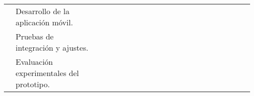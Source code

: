 \begin{landscape}
\begin{ThreePartTable}
\begin{longtable}{|p{}|p{5.5cm}|p{5.5cm}|l|l|l|l|l|l|l|l|l|l|l|l|l|l|l|l|l|l|l|}
      \cline{2-2}\cline{4-21}
                                                                                                                                                                                               & Desarrollo de la aplicación móvil.                                                         &                                                                                                                   &                                       &                                       &                                       &                                       &                        &                        &                        &                        &                        &                        &                        & \cellcolor{magenta!70} & \cellcolor{magenta!70} &                        &                        \\
      \cline{2-2}\cline{4-21}
                                                                                                                                                                                               & Pruebas de integración y ajustes.                                                          &                                                                                                                   &                                       &                                       &                                       &                                       &                        &                        &                        &                        &                        &                        &                        &                        &                        & \cellcolor{magenta!70} &                        \\
      \cline{2-2}\cline{4-21}
                                                                                                                                                                                               & Evaluación experimentales del prototipo.                                                   &                                                                                                                   &                                       &                                       &                                       &                                       &                        &                        &                        &                        &                        &                        &                        &                        &                        & \cellcolor{magenta!70} &                        \\

\end{longtable}
\end{ThreePartTable}
\end{landscape}
